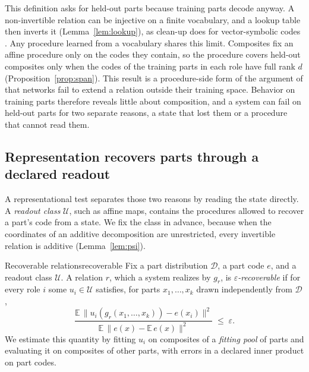 \documentclass[10pt]{article}
\theoremstyle{plain}
\theoremstyle{remark}
\newcommand{\U}{\mathcal{U}}
\newcommand{\D}{\mathcal{D}}
\begin{document}
This definition asks for held-out parts because training parts decode anyway. A non-invertible relation can be injective on a finite vocabulary, and a lookup table then inverts it (Lemma~\ref{lem:lookup}), as clean-up does for vector-symbolic codes \citep{plate1995}. Any procedure learned from a vocabulary shares this limit. Composites fix an affine procedure only on the codes they contain, so the procedure covers held-out composites only when the codes of the training parts in each role have full rank $d$ (Proposition~\ref{prop:span}). This result is a procedure-side form of the argument of \citet{marcus1998} that networks fail to extend a relation outside their training space. Behavior on training parts therefore reveals little about composition, and a system can fail on held-out parts for two separate reasons, a state that lost them or a procedure that cannot read them.

\subsection{Representation recovers parts through a declared readout}
\label{sec:repcomp}

A representational test separates those two reasons by reading the state directly. A \emph{readout class} $\U$, such as affine maps, contains the procedures allowed to recover a part's code from a state. We fix the class in advance, because when the coordinates of an additive decomposition are unrestricted, every invertible relation is additive (Lemma~\ref{lem:psi}).

\begin{defbox}{Recoverable relations}{recoverable}
Fix a part distribution $\D$, a part code $e$, and a readout class $\U$. A relation $r$, which a system realizes by $g_r$, is \emph{$\varepsilon$-recoverable} if for every role $i$ some $u_i \in \U$ satisfies, for parts $x_1, \ldots, x_k$ drawn independently from $\D$,
\begin{equation}
  \frac{\mathbb{E}\,\lVert u_i(g_r(x_1,\ldots,x_k)) - e(x_i) \rVert^2}{\mathbb{E}\,\lVert e(x) - \mathbb{E}\,e(x) \rVert^2} \;\le\; \varepsilon .
  \label{eq:recover}
\end{equation}
We estimate this quantity by fitting $u_i$ on composites of a \emph{fitting pool} of parts and evaluating it on composites of other parts, with errors in a declared inner product on part codes.
\end{defbox}
\end{document}

